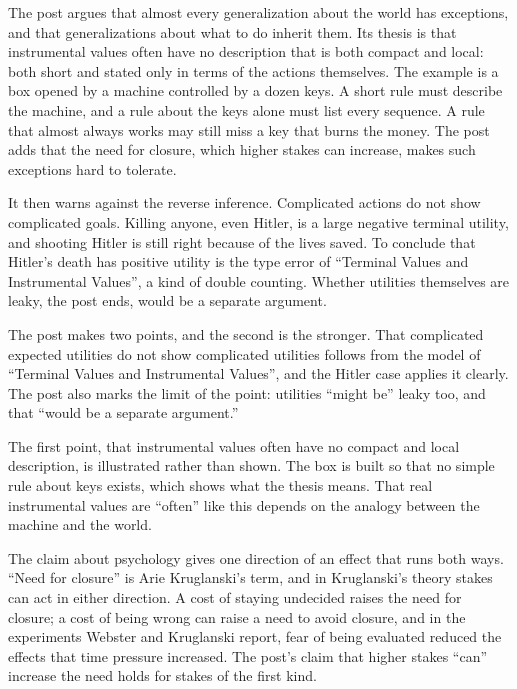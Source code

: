 \begin{afterword}
\summaryhead

The post argues that almost every generalization about the world has exceptions, and that generalizations about what to do inherit them. Its thesis is that instrumental values often have no description that is both compact and local: both short and stated only in terms of the actions themselves. The example is a box opened by a machine controlled by a dozen keys. A short rule must describe the machine, and a rule about the keys alone must list every sequence. A rule that almost always works may still miss a key that burns the money. The post adds that the need for closure, which higher stakes can increase, makes such exceptions hard to tolerate.

It then warns against the reverse inference. Complicated actions do not show complicated goals. Killing anyone, even Hitler, is a large negative terminal utility, and shooting Hitler is still right because of the lives saved. To conclude that Hitler's death has positive utility is the type error of ``Terminal Values and Instrumental Values'', a kind of double counting. Whether utilities themselves are leaky, the post ends, would be a separate argument.

\responsehead

The post makes two points, and the second is the stronger. That complicated expected utilities do not show complicated utilities follows from the model of ``Terminal Values and Instrumental Values'', and the Hitler case applies it clearly. The post also marks the limit of the point: utilities ``might be'' leaky too, and that ``would be a separate argument.''

The first point, that instrumental values often have no compact and local description, is illustrated rather than shown. The box is built so that no simple rule about keys exists, which shows what the thesis means. That real instrumental values are ``often'' like this depends on the analogy between the machine and the world.

The claim about psychology gives one direction of an effect that runs both ways. ``Need for closure'' is Arie Kruglanski's term, and in Kruglanski's theory stakes can act in either direction. A cost of staying undecided raises the need for closure; a cost of being wrong can raise a need to avoid closure, and in the experiments Webster and Kruglanski report, fear of being evaluated reduced the effects that time pressure increased. The post's claim that higher stakes ``can'' increase the need holds for stakes of the first kind.


\end{afterword}

